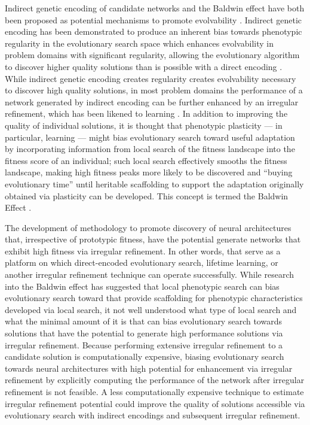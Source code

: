 Indirect genetic encoding of candidate networks and the Baldwin effect have both been proposed as potential mechanisms to promote evolvability \cite{Reisinger2007AcquiringRepresentations,Downing2010TheNetworks}. Indirect genetic encoding has been demonstrated to produce an inherent bias towards phenotypic regularity in the evolutionary search space \cite{Tonelli2013OnNetworks} which enhances evolvability in problem domains with significant regularity, allowing the evolutionary algorithm to discover higher quality solutions than is possible with a direct encoding  \cite{Clune2011OnRegularity}. While indirect genetic encoding creates regularity creates evolvability necessary to discover high quality solutions, in most problem domains the performance of a network generated by indirect encoding can be further enhanced by an irregular refinement, which has been likened to learning \cite{Clune2011OnRegularity}. In addition to improving the quality of individual solutions, it is thought that phenotypic plasticity --- in particular, learning --- might bias evolutionary search toward useful adaptation by incorporating information from local search of the fitness landscape into the fitness score of an individual; such local search effectively smooths the fitness landscape, making high fitness peaks more likely to be discovered and ``buying evolutionary time'' until heritable scaffolding to support the adaptation originally obtained via plasticity can be developed. This concept is termed the Baldwin Effect \cite{Downing2010TheNetworks,Downing2009ComputationalEffect}.

The development of methodology to promote discovery of neural architectures that, irrespective of prototypic fitness, have the potential generate networks that exhibit high fitness via irregular refinement. In other words, that serve as a platform on which direct-encoded evolutionary search, lifetime learning, or another irregular refinement technique can operate successfully. While research into the Baldwin effect has suggested that local phenotypic search can bias evolutionary search toward that provide scaffolding for phenotypic characteristics developed via local search, it not well understood what type of local search and what the minimal amount of it is that can bias evolutionary search towards solutions that have the potential to generate high performance solutions via irregular refinement. Because performing extensive irregular refinement to a candidate solution is computationally expensive, biasing evolutionary search towards neural architectures with high potential for enhancement via irregular refinement by explicitly computing the performance of the network after irregular refinement is not feasible. A less computationally expensive technique to estimate irregular refinement potential could improve the quality of solutions accessible via evolutionary search with indirect encodings and subsequent irregular refinement.

